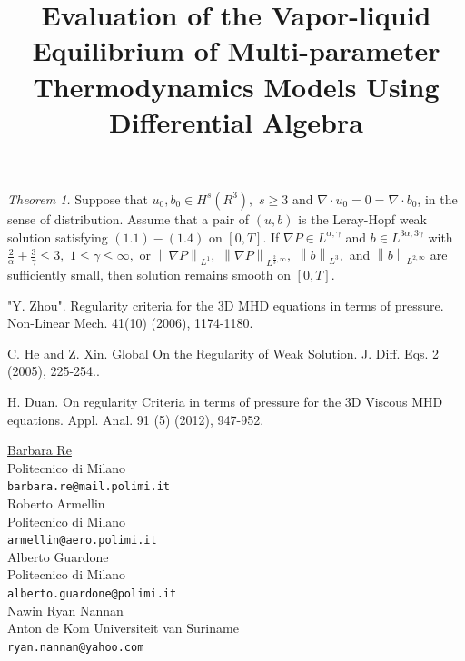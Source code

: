 \documentclass[article, A4, 11pt]{llncs}%
\begin{document}
\textit{Theorem 1.} Suppose  that $u_{0},b_{0}\in H^{s}(R^{3}),$ $s\geq 3$ and $\nabla \cdot u_{0}=0=\nabla \cdot b_{0}$, in the sense of distribution. Assume that a pair of $(u,b)$ is the Leray-Hopf weak solution satisfying $(1.1)-(1.4)$ on $[0,T].$ If $ \nabla P\in L^{\alpha, \gamma}$ and $b\in L^{3\alpha, 3\gamma}$ with $\frac {2} {\alpha}+\frac {3}{\gamma}\leq 3,$
$1\leq \gamma\leq\infty,$ or $\left\|\nabla P\right\|_{L^ {1}},$ $\left\|\nabla P\right\|_{L^ {\frac{2}{3},\infty}},$ $\left\|b\right\|_{L^ {3}},$ and $\left\|b\right\|_{L^ {2,\infty}}$ are sufficiently small, then solution remains smooth on $[0,T].$



\begin{thebibliography}{10}
{\sc "Y. Zhou"}. { Regularity criteria for the 3D MHD equations in terms of pressure}. Non-Linear Mech. 41(10) (2006), 1174-1180.

{\sc C. He and Z. Xin}. {Global On the Regularity of Weak Solution}. J. Diff. Eqs. 2 (2005), 225-254..

{\sc H. Duan}. {On regularity Criteria in terms of pressure for the 3D Viscous MHD equations}. Appl. Anal. 91 (5) (2012), 947-952.
\end{thebibliography} %

\title{Evaluation of the Vapor-liquid Equilibrium of Multi-parameter Thermodynamics Models Using Differential Algebra}
 \author{} \institute{}
\maketitle
\begin{center}
{\large \underline{Barbara Re}}\\
Politecnico di Milano\\
{\tt barbara.re@mail.polimi.it}
\\ \vspace{4mm}
{\large Roberto Armellin}\\
Politecnico di Milano\\
{\tt armellin@aero.polimi.it}
\\ \vspace{4mm}
{\large Alberto Guardone}\\
Politecnico di Milano\\
{\tt alberto.guardone@polimi.it}
\\ \vspace{4mm}
{\large Nawin Ryan Nannan}\\
Anton de Kom Universiteit van Suriname\\
{\tt ryan.nannan@yahoo.com}
\end{center}
\end{document}
